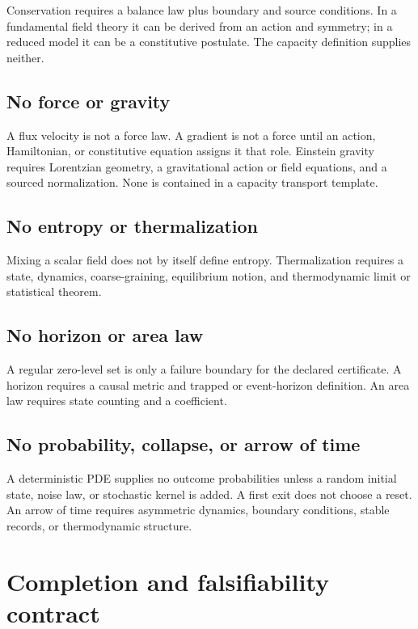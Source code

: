 \documentclass[11pt]{article}
\theoremstyle{definition}
\theoremstyle{remark}
\begin{document}
Conservation requires a balance law plus boundary and source conditions.
In a fundamental field theory it can be derived from an action and
symmetry; in a reduced model it can be a constitutive postulate.  The
capacity definition supplies neither.

\subsection{No force or gravity}

A flux velocity is not a force law.  A gradient is not a force until an
action, Hamiltonian, or constitutive equation assigns it that role.
Einstein gravity requires Lorentzian geometry, a gravitational action or
field equations, and a sourced normalization.  None is contained in a
capacity transport template.

\subsection{No entropy or thermalization}

Mixing a scalar field does not by itself define entropy.  Thermalization
requires a state, dynamics, coarse-graining, equilibrium notion, and
thermodynamic limit or statistical theorem.

\subsection{No horizon or area law}

A regular zero-level set is only a failure boundary for the declared
certificate.  A horizon requires a causal metric and trapped or
event-horizon definition.  An area law requires state counting and a
coefficient.

\subsection{No probability, collapse, or arrow of time}

A deterministic PDE supplies no outcome probabilities unless a random
initial state, noise law, or stochastic kernel is added.  A first exit
does not choose a reset.  An arrow of time requires asymmetric dynamics,
boundary conditions, stable records, or thermodynamic structure.

\section{Completion and falsifiability contract}
\label{sec:contract}
\end{document}

